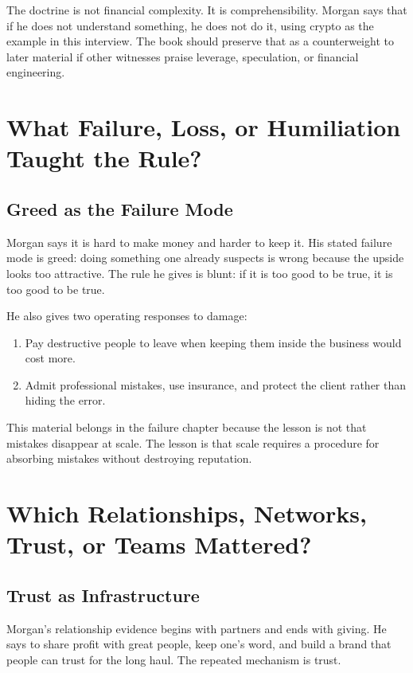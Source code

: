 \documentclass[11pt,oneside]{book}
\begin{document}
The doctrine is not financial complexity. It is comprehensibility. Morgan says that if he does not understand something, he does not do it, using crypto as the example in this interview. The book should preserve that as a counterweight to later material if other witnesses praise leverage, speculation, or financial engineering.

\chapter{What Failure, Loss, or Humiliation Taught the Rule?}

\section{Greed as the Failure Mode}

Morgan says it is hard to make money and harder to keep it. His stated failure mode is greed: doing something one already suspects is wrong because the upside looks too attractive. The rule he gives is blunt: if it is too good to be true, it is too good to be true.

He also gives two operating responses to damage:

\begin{enumerate}
\item Pay destructive people to leave when keeping them inside the business would cost more.
\item Admit professional mistakes, use insurance, and protect the client rather than hiding the error.
\end{enumerate}

This material belongs in the failure chapter because the lesson is not that mistakes disappear at scale. The lesson is that scale requires a procedure for absorbing mistakes without destroying reputation.

\chapter{Which Relationships, Networks, Trust, or Teams Mattered?}

\section{Trust as Infrastructure}

Morgan's relationship evidence begins with partners and ends with giving. He says to share profit with great people, keep one's word, and build a brand that people can trust for the long haul. The repeated mechanism is trust.
\end{document}
